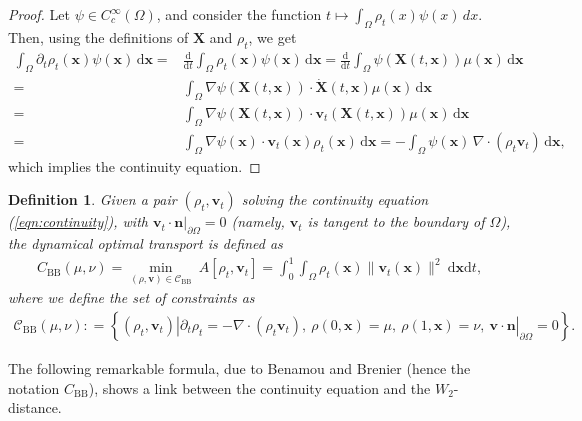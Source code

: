 \documentclass[11pt]{book}
\newtheorem{definition}[theorem]{Definition}
\newcommand{\dx}{\mathrm{d}\mathbf{x}}
\newcommand{\dt}{\mathrm{d}t}
\begin{document}
\begin{proof}
Let $\psi \in C_c^\infty(\Omega)$, and consider the function $t \mapsto \int_\Omega \rho_t(x) \psi(x) \, dx$. Then, using the definitions of $\mathbf{X}$ and $\rho_t$, we get
\begin{align*}
\int_\Omega \partial_t \rho_t(\mathbf{x}) \psi(\mathbf{x}) \, \text{d}\mathbf{x} = &\frac{\text{d}}{\text{d}t} \int_\Omega \rho_t(\mathbf{x}) \psi(\mathbf{x}) \, \text{d}\mathbf{x} = \frac{\text{d}}{\text{d}t} \int_\Omega \psi(\mathbf{X}(t,\mathbf{x})) \mu(\mathbf{x}) \, \text{d}\mathbf{x} \\
=& \int_\Omega \nabla \psi(\mathbf{X}(t, \mathbf{x})) \cdot \dot{\mathbf{X}}(t, \mathbf{x}) \mu(\mathbf{x}) \, \text{d}\mathbf{x} \\
=& \int_\Omega \nabla \psi(\mathbf{X}(t, \mathbf{x})) \cdot \mathbf{v}_t(\mathbf{X}(t, \mathbf{x})) \mu(\mathbf{x}) \, \text{d}\mathbf{x} \\
=& \int_\Omega \nabla \psi(\mathbf{x}) \cdot \mathbf{v}_t(\mathbf{x}) \rho_t(\mathbf{x}) \, \text{d}\mathbf{x} = -\int_\Omega \psi(\mathbf{x}) \, \nabla\cdot(\rho_t \mathbf{v}_t) \, \text{d}\mathbf{x},
\end{align*}
which implies the continuity equation.
\end{proof}

\begin{definition}
Given a pair $(\rho_t, \mathbf{v}_t)$ solving the continuity equation (\ref{eqn:continuity}), with $\mathbf{v}_t \cdot \mathbf{n}|_{\partial \Omega} = 0$ (namely, $\mathbf{v}_t$ is tangent to the boundary of $\Omega$), the dynamical optimal transport is defined as
\begin{align}\label{eqn:dynamicalOT02}
    C_{\mathrm{BB}}(\mu,\nu) = \min_{(\rho,\mathbf{v})\in\mathcal{C}_{\mathrm{BB}}}\  A[\rho_t, \mathbf{v}_t] = \int_0^1\int_{\Omega} \rho_t(\mathbf{x}) \|\mathbf{v}_t(\mathbf{x})\|^2 \ \dx\dt,
\end{align}
where we define the set of constraints as
\begin{align}
    \mathcal{C}_{\mathrm{BB}}(\mu,\nu) : = \left\{ (\rho_t,\mathbf{v}_t) | \partial_t\rho_t = -\nabla\cdot(\rho_t \mathbf{v}_t),\ \rho(0,\mathbf{x})=\mu,\ \rho(1,\mathbf{x})=\nu,\ \mathbf{v}\cdot \mathbf{n}|_{\partial \Omega} = 0  \right\}.
\end{align}
\end{definition}

The following remarkable formula, due to Benamou and Brenier \cite{benamou2000computational} (hence the notation $C_{\mathrm{BB}}$), shows a link between the continuity equation and the $W_2$-distance.
\end{document}
